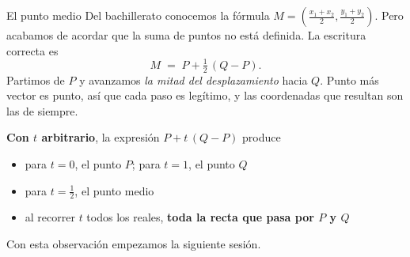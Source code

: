 \documentclass[aspectratio=169,10pt]{beamer}
\newcommand{\destaca}[1]{%
  \par\vspace{3pt}\noindent
  \colorbox{turquesaClaro}{%
    \parbox{\dimexpr\linewidth-2\fboxsep\relax}{\vspace{3pt}#1\vspace{3pt}}}%
  \par\vspace{3pt}}
\begin{document}
\begin{frame}{El punto medio}
  Del bachillerato conocemos la fórmula
  $M=\left(\frac{x_1+x_2}{2},\frac{y_1+y_2}{2}\right)$.
  Pero acabamos de acordar que la suma de puntos no está definida.
  La escritura correcta es
  \[
    M \;=\; P+\tfrac{1}{2}\,(Q-P).
  \]
  Partimos de $P$ y avanzamos \textit{la mitad del desplazamiento}
  hacia $Q$. Punto más vector es punto, así que cada paso es legítimo,
  y las coordenadas que resultan son las de siempre.

  \vspace{0.3cm}
  \destaca{\textbf{Con $t$ arbitrario}, la expresión $P+t\,(Q-P)$ produce

  \begin{itemize}
    \item para $t=0$, el punto $P$; para $t=1$, el punto $Q$
    \item para $t=\tfrac12$, el punto medio
    \item al recorrer $t$ todos los reales, \textbf{toda la recta que
      pasa por $P$ y $Q$}
  \end{itemize}
  Con esta observación empezamos la siguiente sesión.}
\end{frame}
\end{document}
